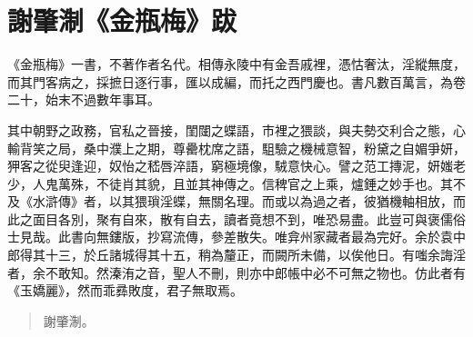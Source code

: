 \chapter*{謝肇淛《金瓶梅》跋}

《金瓶梅》一書，不著作者名代。相傳永陵中有金吾戚裡，憑怙奢汰，淫縱無度，而其門客病之，採摭日逐行事，匯以成編，而托之西門慶也。書凡數百萬言，為卷二十，始末不過數年事耳。

其中朝野之政務，官私之晉接，閨闥之蝶語，市裡之猥談，與夫勢交利合之態，心輸背笑之局，桑中濮上之期，尊罍枕席之語，駔驗之機械意智，粉黛之自媚爭妍，狎客之從臾逢迎，奴怡之嵇唇淬語，窮極境像，駥意快心。譬之范工摶泥，妍媸老少，人鬼萬殊，不徒肖其貌，且並其神傳之。信稗官之上乘，爐錘之妙手也。其不及《水滸傳》者，以其猥瑣淫蝶，無關名理。而或以為過之者，彼猶機軸相放，而此之面目各別，聚有自來，散有自去，讀者竟想不到，唯恐易盡。此豈可與褒儒俗士見哉。此書向無鏤版，抄寫流傳，參差散失。唯弇州家藏者最為完好。余於袁中郎得其十三，於丘諸城得其十五，稍為釐正，而闕所未備，以俟他日。有嗤余誨淫者，余不敢知。然溱洧之音，聖人不刪，則亦中郎帳中必不可無之物也。仿此者有《玉嬌麗》，然而乖彞敗度，君子無取焉。
  
\begin{quotation}\begin{flushright}謝肇淛。\end{flushright}\end{quotation}

